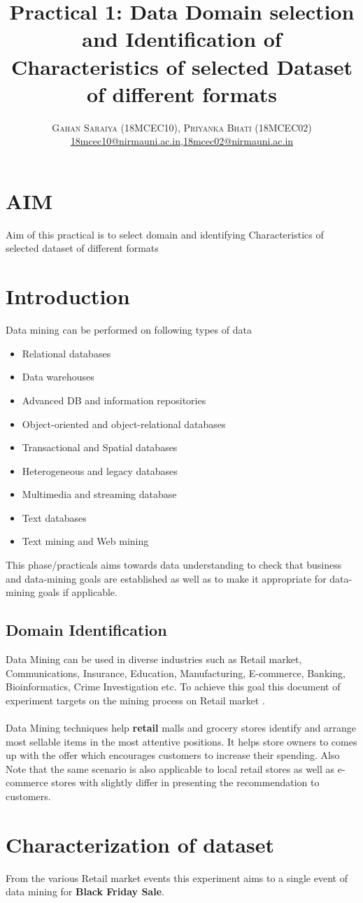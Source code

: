\documentclass[paper=letter, fontsize=12pt]{article}
\title{\vspace{-15mm}\fontsize{24pt}{10pt}\selectfont\textbf{Practical 1: Data Domain selection and Identification of Characteristics of selected Dataset of different formats}} %
\author{
\large
{\textsc{Gahan Saraiya (18MCEC10), Priyanka Bhati (18MCEC02) }}\\[2mm]
\normalsize \href{mailto:18mcec10@nirmauni.ac.in}{18mcec10@nirmauni.ac.in},\href{mailto:18mcec02@nirmauni.ac.in}{18mcec02@nirmauni.ac.in}\\[2mm] %
}
\date{}
\begin{document}
\maketitle %
\thispagestyle{fancy} %

\section{AIM}
Aim of this practical is to select domain and identifying Characteristics of selected dataset of different formats

\section{Introduction}
Data mining can be performed on following types of data 
\begin{itemize}
    \item Relational databases
    \item Data warehouses
    \item Advanced DB and information repositories
    \item Object-oriented and object-relational databases
    \item Transactional and Spatial databases
    \item Heterogeneous and legacy databases
    \item Multimedia and streaming database
    \item Text databases
    \item Text mining and Web mining 
\end{itemize}
This phase/practicals aims towards data understanding to check that business and data-mining goals are established as well as to make it appropriate for data-mining goals if applicable.

\subsection{Domain Identification}
Data Mining can be used in diverse industries such as Retail market, Communications, Insurance, Education, Manufacturing, E-commerce, Banking, Bioinformatics, Crime Investigation etc.
To achieve this goal this document of experiment targets on the mining process on Retail market .
\paragraph{} Data Mining techniques help \textbf{retail} malls and grocery stores identify and arrange most sellable items in the most attentive positions. It helps store owners to comes up with the offer which encourages customers to increase their spending. 
Also Note that the same scenario is also applicable to local retail stores as well as e-commerce stores with slightly differ in presenting the recommendation to customers.


\section{Characterization of dataset}
From the various Retail market events this experiment aims to a single event of data mining for \textbf{Black Friday Sale}.

\end{document}
